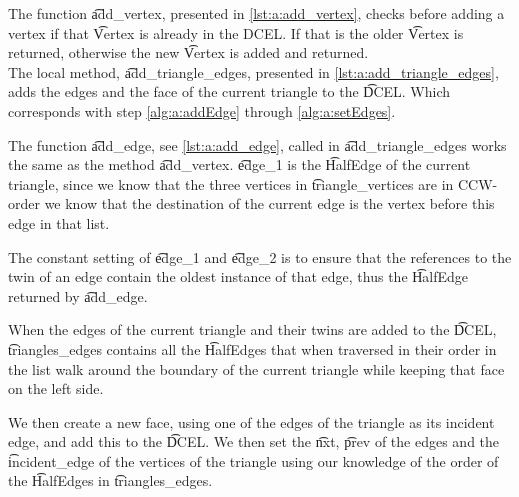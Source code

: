 		

	The function \t{add_vertex}, presented in \autoref{lst:a:add_vertex}, checks before adding a vertex if that \t{Vertex} is already in the DCEL. If that is the older \t{Vertex} is returned, otherwise the new \t{Vertex} is added and returned.\\

		

	The local method, \t{add_triangle_edges}, presented in \autoref{lst:a:add_triangle_edges}, adds the edges and the face of the current triangle to the \t{DCEL}. Which corresponds with step \ref{alg:a:addEdge} through \ref{alg:a:setEdges}.

	

	The function \t{add_edge}, see \autoref{lst:a:add_edge}, called in \t{add_triangle_edges} works the same as the method \t{add_vertex}. \t{edge_1} is the \t{HalfEdge} of the current triangle, since we know that the three vertices in \t{triangle_vertices} are in CCW-order we know that the destination of the current edge is the vertex before this edge in that list.

	The constant setting of \t{edge_1} and \t{edge_2} is to ensure that the references to the twin of an edge contain the oldest instance of that edge, thus the \t{HalfEdge} returned by \t{add_edge}.

	When the edges of the current triangle and their twins are added to the \t{DCEL}, \t{triangles_edges} contains all the \t{HalfEdge}s that when traversed in their order in the list walk around the boundary of the current triangle while keeping that face on the left side.

	We then create a new face, using one of the edges of the triangle as its incident edge, and add this to the \t{DCEL}. We then set the \t{nxt}, \t{prev} of the edges and the \t{incident_edge} of the vertices of the triangle using our knowledge of the order of the \t{HalfEdges} in \t{triangles_edges}.

	

